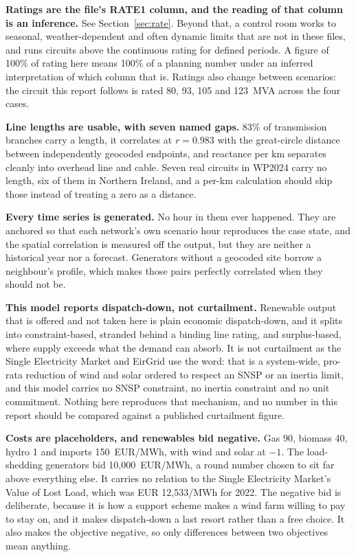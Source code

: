 \documentclass[11pt,a4paper]{article}
\begin{document}
\textbf{Ratings are the file's RATE1 column, and the reading of that column is
an inference.} See Section~\ref{sec:rate}. Beyond that, a control room works to
seasonal, weather-dependent and often dynamic limits that are not in these
files, and runs circuits above the continuous rating for defined periods. A
figure of 100\% of rating here means 100\% of a planning number under an
inferred interpretation of which column that is. Ratings also change between
scenarios: the circuit this report follows is rated 80, 93, 105 and 123~MVA
across the four cases.

\textbf{Line lengths are usable, with seven named gaps.} 83\% of transmission
branches carry a length, it correlates at $r = 0.983$ with the great-circle
distance between independently geocoded endpoints, and reactance per km
separates cleanly into overhead line and cable. Seven real circuits in WP2024
carry no length, six of them in Northern Ireland, and a per-km calculation
should skip those instead of treating a zero as a distance.

\textbf{Every time series is generated.} No hour in them ever happened. They
are anchored so that each network's own scenario hour reproduces the case
state, and the spatial correlation is measured off the output, but they are
neither a historical year nor a forecast. Generators
without a geocoded site borrow a neighbour's profile, which makes those pairs
perfectly correlated when they should not be.

\textbf{This model reports dispatch-down, not curtailment.} Renewable output
that is offered and not taken here is plain economic dispatch-down, and it
splits into constraint-based, stranded behind a binding line rating, and
surplus-based, where supply exceeds what the demand can absorb. It is not
curtailment as the Single Electricity Market and EirGrid use the word: that is
a system-wide, pro-rata reduction of wind and solar ordered to respect an SNSP
or an inertia limit, and this model carries no SNSP constraint, no inertia
constraint and no unit commitment. Nothing here reproduces that mechanism, and
no number in this report should be compared against a published curtailment
figure.

\textbf{Costs are placeholders, and renewables bid negative.} Gas 90, biomass
40, hydro 1 and imports 150~EUR/MWh, with wind and solar at $-1$. The
load-shedding generators bid 10{,}000~EUR/MWh, a round number chosen to sit far
above everything else. It carries no relation to the Single Electricity
Market's Value of Lost Load, which was EUR 12{,}533/MWh for 2022.
The negative bid is deliberate, because it is how a support scheme makes a wind
farm willing to pay to stay on, and it makes dispatch-down a last resort
rather than a free choice. It also makes the objective negative, so only differences
between two objectives mean anything.
\end{document}

